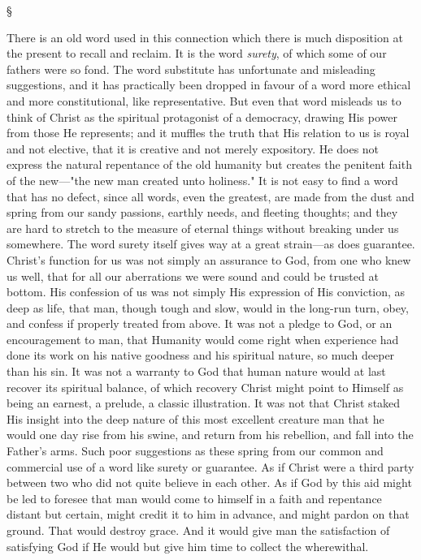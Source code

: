 \documentclass[12pt,a5paper,twoside,titlepage]{book}
\begin{document}
\begin{center}
\S
\end{center}

There is an old word used in this connection 
which there is much disposition at the present 
to recall and reclaim. It is the word \textit{surety}, of 
which some of our fathers were so fond. The 
word substitute has unfortunate and misleading 
suggestions, and it has practically been dropped 
in favour of a word more ethical and more constitutional, 
like representative. But even that 
word misleads us to think of Christ as the 
spiritual protagonist of a democracy, drawing 
His power from those He represents; and it 
muffles the truth that His relation to us is royal 
and not elective, that it is creative and not 
merely expository. He does not express the 
natural repentance of the old humanity but 
creates the penitent faith of the new---"the 
new man created unto holiness." It is not 
easy to find a word that has no defect, since 
all words, even the greatest, are made from 
the dust and spring from our sandy passions, 
earthly needs, and fleeting thoughts; and they 
are hard to stretch to the measure of eternal 
things without breaking under us somewhere. 
The word surety itself gives way at a great 
strain---as does guarantee. Christ's function for 
us was not simply an assurance to God, from one 
who knew us well, that for all our aberrations 
we were sound and could be trusted at bottom. 
His confession of us was not simply His 
expression of His conviction, as deep as life, 
that man, though tough and slow, would in 
the long-run turn, obey, and confess if properly 
treated from above. It was not a pledge to God, 
or an encouragement to man, that Humanity 
would come right when experience had done its 
work on his native goodness and his spiritual 
nature, so much deeper than his sin. It was not 
a warranty to God that human nature would 
at last recover its spiritual balance, of which 
recovery Christ might point to Himself as being 
an earnest, a prelude, a classic illustration. It 
was not that Christ staked His insight into the 
deep nature of this most excellent creature man 
that he would one day rise from his swine, and return 
from his rebellion, and fall into the Father's 
arms. Such poor suggestions as these spring 
from our common and commercial use of a word 
like surety or guarantee. As if Christ were a 
third party between two who did not quite believe 
in each other. As if God by this aid might be 
led to foresee that man would come to himself 
in a faith and repentance distant but certain, 
might credit it to him in advance, and might 
pardon on that ground. That would destroy 
grace. And it would give man the satisfaction 
of satisfying God if He would but give him time 
to collect the wherewithal. 
\end{document}
